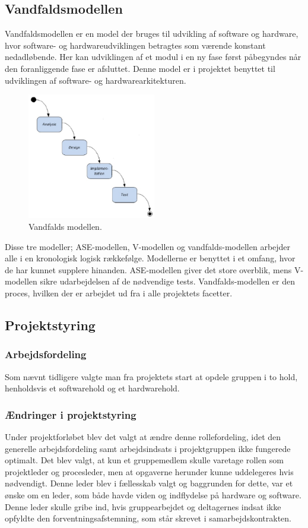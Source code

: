 \subsection{Vandfaldsmodellen}
Vandfaldsmodellen er en model der bruges til udvikling af software og hardware, hvor software- og hardwareudviklingen betragtes som værende konstant nedadløbende. Her kan udviklingen af et modul i en ny fase først påbegyndes når den foranliggende fase er afsluttet. Denne model er i projektet benyttet til udviklingen af software- og hardwarearkitekturen. 
\begin{figure}[H]
\includegraphics[width =0.5\textwidth , center]{billeder/Vandfald}
\caption{Vandfalds modellen.}
\end{figure} 
Disse tre modeller; ASE-modellen, V-modellen og vandfalds-modellen arbejder alle i en kronologisk logisk rækkefølge. Modellerne er benyttet i et omfang, hvor de har kunnet supplere hinanden. ASE-modellen giver det store overblik, mens V-modellen sikre udarbejdelsen af de nødvendige tests. Vandfalds-modellen er den proces, hvilken der er arbejdet ud fra i alle projektets facetter.   
\subsection{Projektstyring}
\subsubsection{Arbejdsfordeling}
Som nævnt tidligere valgte man fra projektets start at opdele gruppen i to hold, henholdsvis et softwarehold og et hardwarehold.
\subsubsection{Ændringer i projektstyring}
Under projektforløbet blev det valgt at ændre denne rollefordeling, idet den generelle arbejdsfordeling samt arbejdsindsats i projektgruppen ikke fungerede optimalt. Det blev valgt, at kun et gruppemedlem skulle varetage rollen som projektleder og procesleder, men at opgaverne herunder kunne uddelegeres hvis nødvendigt. Denne leder blev i fællesskab valgt og baggrunden for dette, var et ønske om en leder, som både havde viden og indflydelse på hardware og software. Denne leder skulle gribe ind, hvis gruppearbejdet og deltagernes indsat ikke opfyldte den forventningsafstemning, som står skrevet i samarbejdskontrakten. 
